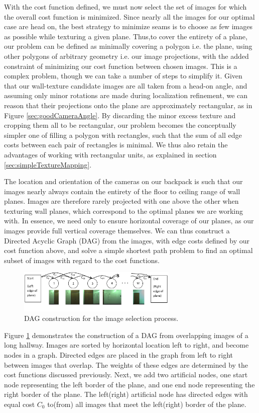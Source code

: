 \message{ !name(paper.tex)}\documentclass[10pt,twocolumn,letterpaper]{article}
\begin{document}
With the cost function defined, we must now select the set of images
for which the overall cost function is minimized. Since nearly all the
images for our optimal case are head on, the best strategy to minimize
seams is to choose as few images as possible while texturing a given
plane. Thus,to cover the entirety of a plane, our problem can be
defined as minimally covering a polygon i.e. the plane, using other
polygons of arbitrary geometry i.e. our image projections, with the
added constraint of minimizing our cost function between chosen
images.  This is a complex problem, though we can take a number of
steps to simplify it. Given that our wall-texture candidate images are
all taken from a head-on angle, and assuming only minor rotations are
made during localization refinement, we can reason that their
projections onto the plane are approximately rectangular, as in Figure
\ref{sec:goodCameraAngle}. By discarding the minor excess texture and
cropping them all to be rectangular, our problem becomes the
conceptually simpler one of filling a polygon with rectangles, such
that the sum of all edge costs between each pair of rectangles is
minimal. We thus also retain the advantages of working with
rectangular units, as explained in section
\ref{sec:simpleTextureMapping}.

The location and orientation of the cameras on our backpack is such
that our images nearly always contain the entirety of the floor to
ceiling range of wall planes. Images are therefore rarely projected
with one above the other when texturing wall planes, which correspond
to the optimal planes we are working with.  In essence, we need only
to ensure horizontal coverage of our planes, as our images provide
full vertical coverage themselves. We can thus construct a Directed
Acyclic Graph (DAG) from the images, with edge costs defined by our
cost function above, and solve a simple shortest path problem to find
an optimal subset of images with regard to the cost functions.

\begin{figure}
  \centering
  \includegraphics[width=3in]{dagCreation.pdf}
  \caption{DAG construction for the image selection process.}
  \label{fig:dagCreation}
\end{figure}

Figure \ref{fig:dagCreation} demonstrates the construction of a DAG
from overlapping images of a long hallway. Images are sorted by
horizontal location left to right, and become nodes in a
graph. Directed edges are placed in the graph from left to right
between images that overlap. The weights of these edges are determined
by the cost functions discussed previously. Next, we add two
artificial nodes, one start node representing the left border of the
plane, and one end node representing the right border of the
plane. The left(right) artificial node has directed edges with equal
cost $C_0$ to(from) all images that meet the left(right) border of the
plane.
\end{document}
